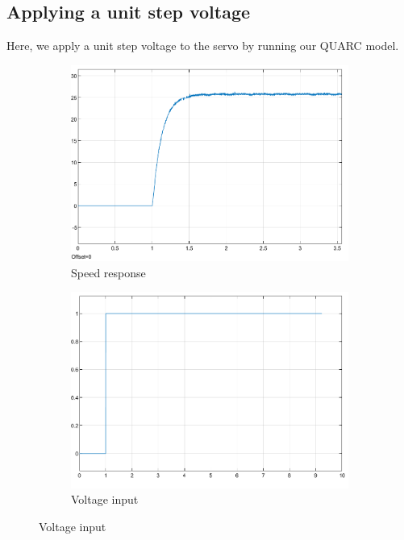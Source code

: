 \documentclass{article}
\begin{document}
\subsection{Applying a unit step voltage}
Here, we apply a unit step voltage to the servo by running our QUARC model.
\begin{figure}[H]
    \centering
    \begin{subfigure}[b]{0.45\linewidth}
        \centering
        \includegraphics[width=\linewidth]{speed.png}
        \caption{Speed response}
        \label{fig:speed}
    \end{subfigure}
    \hfill
    \begin{subfigure}[b]{0.45\linewidth}
        \centering
        \includegraphics[width=\linewidth]{voltage.png}
        \caption{Voltage input}
        \label{fig:voltage}

\end{subfigure}
\end{figure}
\end{document}
